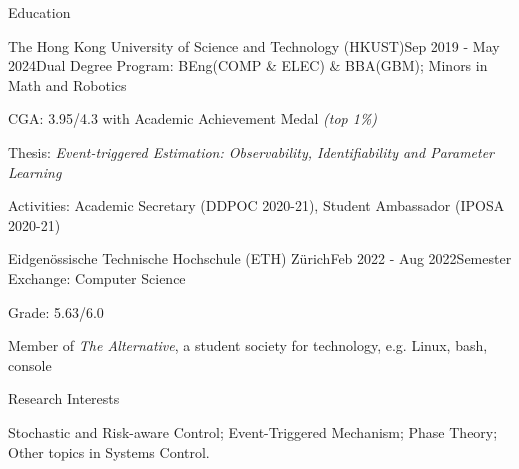 \documentclass{resume}
\begin{document}
\begin{rSection}{Education}

    \begin{rSubsection}{The Hong Kong University of Science and Technology (HKUST)}{Sep 2019 - May 2024}{Dual Degree Program: BEng(COMP \& ELEC) \& BBA(GBM); Minors in Math and Robotics}{}
        \item CGA: 3.95/4.3 with Academic Achievement Medal \emph{(top 1\%)}
        \item Thesis: \emph{Event-triggered Estimation: Observability, Identifiability and Parameter Learning}
        \item Activities: Academic Secretary (DDPOC 2020-21), Student Ambassador (IPOSA 2020-21)
    \end{rSubsection}
    
    \begin{rSubsection}{Eidgenössische Technische Hochschule (ETH) Zürich}{Feb 2022 - Aug 2022}{Semester Exchange: Computer Science}{}
        \item Grade: 5.63/6.0
        \item Member of \emph{The Alternative}, a student society for technology, e.g. Linux, bash, console
    \end{rSubsection}

\end{rSection}

\begin{rSection}{Research Interests}

    Stochastic and Risk-aware Control; Event-Triggered Mechanism; Phase Theory; Other topics in Systems Control. 

\end{rSection}
\end{document}
